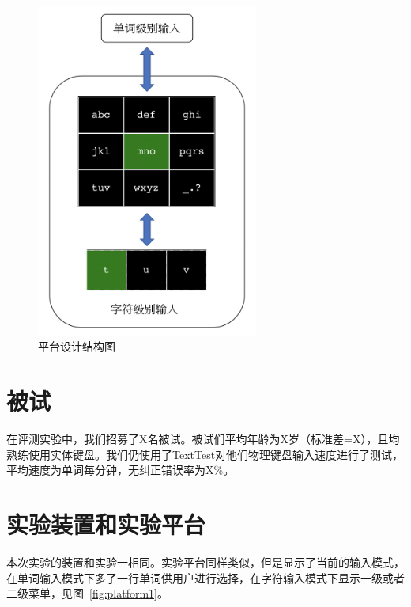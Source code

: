 \begin{figure}[htbp] %
    \centering
    \includegraphics[height=11cm]{figures/design.png}
    \caption{平台设计结构图}
    \label{fig:design}
\end{figure}

\section{被试}
在评测实验中，我们招募了X名被试。被试们平均年龄为X岁（标准差=X），且均熟练使用实体键盘。我们仍使用了TextTest\cite{texttest}\cite{wobbrock2006analyzing}对他们物理键盘输入速度进行了测试，平均速度为单词每分钟，无纠正错误率为X\%。

\section{实验装置和实验平台}
本次实验的装置和实验一相同。实验平台同样类似，但是显示了当前的输入模式，在单词输入模式下多了一行单词供用户进行选择，在字符输入模式下显示一级或者二级菜单，见图~\ref{fig:platform1}。

